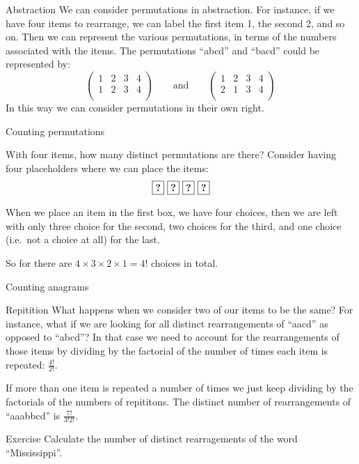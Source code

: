 \begin{frame}{Abstraction}
    We can consider permutations in abstraction.
    For instance, if we have four items to rearrange, we can label the first item 1, the second 2, and so on.
    Then we can represent the various permutations, in terms of the numbers associated with the items.
    The permutations ``abcd'' and ``bacd'' could be represented by:
      \[ \left( \begin{array}{cccc} 1 & 2 & 3 & 4 \\ 1 & 2 & 3 & 4 \\ \end{array} \right) 
          \qquad \textrm{and} \qquad
         \left( \begin{array}{cccc} 1 & 2 & 3 & 4 \\ 2 & 1 & 3 & 4 \\ \end{array} \right) \]
    In this way we can consider permutations in their own right.
\end{frame}


\begin{frame}[fragile]{Counting permutations}
  \begin{block}{With four items, how many distinct permutations are there?}
    Consider having four placeholders where we can place the items:
    \[ \textbf{\fbox{?}} \  \textbf{\fbox{?}} \  \textbf{\fbox{?}} \  \textbf{\fbox{?}} \]
    
    When we place an item in the first box, we have four choices, then we are left with only three choice for the second, two choices for the third, and one choice (i.e.\ not a choice at all) for the last.

  So for there are $4 \times 3 \times 2 \times 1 = 4!$ choices in total.
  \end{block}


\end{frame}

\begin{frame}[fragile]{Counting anagrams}
  \begin{block}{Repitition}
    What happens when we consider two of our items to be the same?
    For instance, what if we are looking for all distinct rearrangements of ``aacd'' as opposed to ``abcd''?
  In that case we need to account for the rearrangements of those items by dividing by the factorial of the number of times each item is repeated: $\frac{4!}{2!}$.
  \end{block}
  
  If more than one item is repeated a number of times we just keep dividing by the factorials of the numbers of repititons.
  The distinct number of rearrangements of ``aaabbcd'' is $\frac{7!}{3!2!}$.

  \begin{block}{Exercise}
    Calculate the number of distinct rearragements of the word ``Mississippi''.
  \end{block}
\end{frame}


